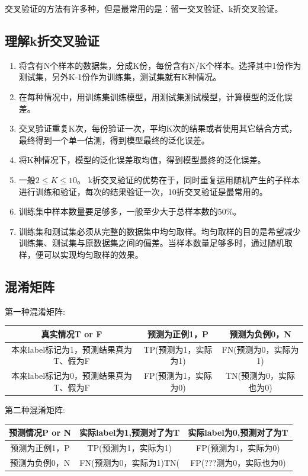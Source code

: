 交叉验证的方法有许多种，但是最常用的是：留一交叉验证、k折交叉验证。

\subsection{理解k折交叉验证}

\begin{enumerate}
	\itemsep0em 
	\item 将含有N个样本的数据集，分成K份，每份含有N/K个样本。选择其中1份作为测试集，另外K-1份作为训练集，测试集就有K种情况。 
	\item 在每种情况中，用训练集训练模型，用测试集测试模型，计算模型的泛化误差。 
	\item 交叉验证重复K次，每份验证一次，平均K次的结果或者使用其它结合方式，最终得到一个单一估测，得到模型最终的泛化误差。 
	\item 将K种情况下，模型的泛化误差取均值，得到模型最终的泛化误差。  
	\item 一般$2\leqslant K \leqslant10$。 k折交叉验证的优势在于，同时重复运用随机产生的子样本进行训练和验证，每次的结果验证一次，10折交叉验证是最常用的。 
	\item 训练集中样本数量要足够多，一般至少大于总样本数的$50\%$。 
	\item 训练集和测试集必须从完整的数据集中均匀取样。均匀取样的目的是希望减少训练集、测试集与原数据集之间的偏差。当样本数量足够多时，通过随机取样，便可以实现均匀取样的效果。 
\end{enumerate}

\subsection{混淆矩阵}

第一种混淆矩阵:

\begin{table}[h]
	\centering
	\begin{tabular}{|c|c|c|}\hline
		真实情况T or F&预测为正例1，P&预测为负例0，N \\\hline
		本来label标记为1，预测结果真为T、假为F&TP(预测为1，实际为1)&FN(预测为0，实际为1)\\\hline
		本来label标记为0，预测结果真为T、假为F&FP(预测为1，实际为0)&TN(预测为0，实际也为0)\\\hline
	\end{tabular}
\end{table}


第二种混淆矩阵:

\begin{table}[h]
	\centering
	\begin{tabular}{|c|c|c|}\hline
		预测情况P or N&实际label为1,预测对了为T&实际label为0,预测对了为T \\\hline
		预测为正例1，P&TP(预测为1，实际为1)&FP(预测为1，实际为0) \\\hline
		预测为负例0，N&FN(预测为0，实际为1)TN(&FP(???测为0，实际也为0) \\\hline
	\end{tabular}
\end{table}

